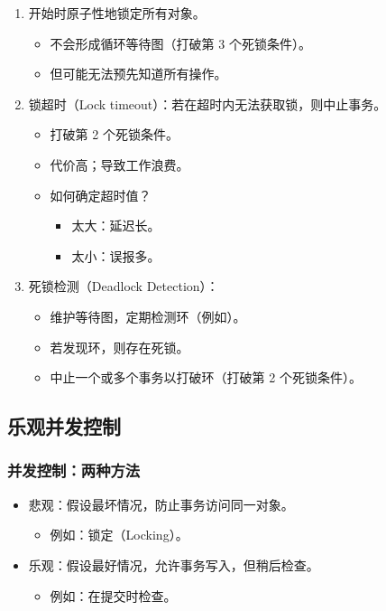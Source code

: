 \documentclass[UTF8,a4paper,11pt]{ctexart}
\begin{document}
\begin{enumerate}
  \item 开始时原子性地锁定所有对象。
  \begin{itemize}
    \item 不会形成循环等待图（打破第 3 个死锁条件）。
    \item 但可能无法预先知道所有操作。
  \end{itemize}
  \item 锁超时（Lock timeout）：若在超时内无法获取锁，则中止事务。
  \begin{itemize}
    \item 打破第 2 个死锁条件。
    \item 代价高；导致工作浪费。
    \item 如何确定超时值？
    \begin{itemize}
      \item 太大：延迟长。
      \item 太小：误报多。
    \end{itemize}
  \end{itemize}
  \item 死锁检测（Deadlock Detection）：
  \begin{itemize}
    \item 维护等待图，定期检测环（例如）。
    \item 若发现环，则存在死锁。
    \item 中止一个或多个事务以打破环（打破第 2 个死锁条件）。
  \end{itemize}
\end{enumerate}

\subsection{乐观并发控制}

\subsubsection{并发控制：两种方法}

\begin{itemize}
  \item 悲观：假设最坏情况，防止事务访问同一对象。
  \begin{itemize}
    \item 例如：锁定（Locking）。
  \end{itemize}
  \item 乐观：假设最好情况，允许事务写入，但稍后检查。
  \begin{itemize}
    \item 例如：在提交时检查。
  \end{itemize}
\end{itemize}
\end{document}
